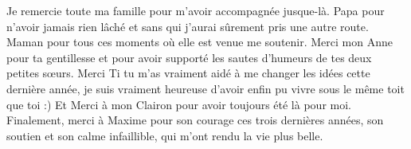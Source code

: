Je remercie toute ma famille pour m’avoir accompagnée jusque-là. 
Papa pour n'avoir jamais rien lâché et sans qui j’aurai sûrement pris une autre route. Maman pour tous ces moments où elle est venue me soutenir. Merci mon Anne pour ta gentillesse et pour avoir supporté les sautes d'humeurs de tes deux petites s\oe{}urs.
Merci Ti tu m'as vraiment aidé à me changer les idées cette dernière année, je suis vraiment heureuse d'avoir enfin pu vivre sous le même toit que toi :) Et Merci à mon Clairon pour avoir toujours été là pour moi. 
Finalement, merci à Maxime pour son courage ces trois dernières années, son soutien et son calme infaillible, qui m'ont rendu la vie plus belle.

